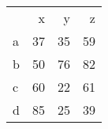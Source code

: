 \begin{tabular}{lrrr}
 & x & y & z \\
a & 37 & 35 & 59 \\
b & 50 & 76 & 82 \\
c & 60 & 22 & 61 \\
d & 85 & 25 & 39 \\
\end{tabular}
